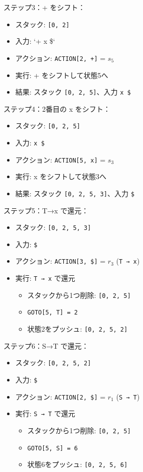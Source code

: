 ステップ3：+ をシフト：

\begin{itemize}
\tightlist
\item
  スタック: \texttt{{[}0,\ 2{]}}
\item
  入力: `+ x \$`
\item
  アクション: \texttt{ACTION{[}2,\ +{]}} = \(s_5\)
\item
  実行: + をシフトして状態5へ
\item
  結果: スタック \texttt{{[}0,\ 2,\ 5{]}}、入力 \texttt{x\ \$}
\end{itemize}

ステップ4：2番目の x をシフト：

\begin{itemize}
\tightlist
\item
  スタック: \texttt{{[}0,\ 2,\ 5{]}}
\item
  入力: \texttt{x\ \$}
\item
  アクション: \texttt{ACTION{[}5,\ x{]}} = \(s_3\)
\item
  実行: x をシフトして状態3へ
\item
  結果: スタック \texttt{{[}0,\ 2,\ 5,\ 3{]}}、入力 \texttt{\$}
\end{itemize}

ステップ5：T→x で還元：

\begin{itemize}
\tightlist
\item
  スタック: \texttt{{[}0,\ 2,\ 5,\ 3{]}}
\item
  入力: \texttt{\$}
\item
  アクション: \texttt{ACTION{[}3,\ \${]}} = \(r_3\) (\texttt{T\ →\ x})
\item
  実行: \texttt{T\ →\ x} で還元

  \begin{itemize}
  \tightlist
  \item
    スタックから1つ削除: \texttt{{[}0,\ 2,\ 5{]}}
  \item
    \texttt{GOTO{[}5,\ T{]}\ =\ 2}
  \item
    状態2をプッシュ: \texttt{{[}0,\ 2,\ 5,\ 2{]}}
  \end{itemize}
\end{itemize}

ステップ6：S→T で還元：

\begin{itemize}
\tightlist
\item
  スタック: \texttt{{[}0,\ 2,\ 5,\ 2{]}}
\item
  入力: \texttt{\$}
\item
  アクション: \texttt{ACTION{[}2,\ \${]}} = \(r_1\) (\texttt{S\ →\ T})
\item
  実行: \texttt{S\ →\ T} で還元

  \begin{itemize}
  \tightlist
  \item
    スタックから1つ削除: \texttt{{[}0,\ 2,\ 5{]}}
  \item
    \texttt{GOTO{[}5,\ S{]}\ =\ 6}
  \item
    状態6をプッシュ: \texttt{{[}0,\ 2,\ 5,\ 6{]}}
  \end{itemize}
\end{itemize}

